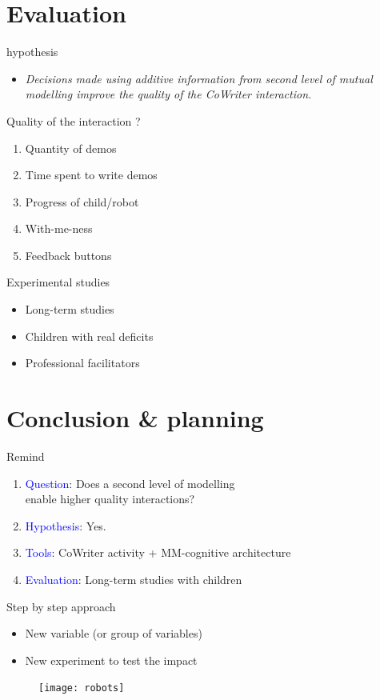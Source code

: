 \documentclass[compress]{beamer}
\begin{document}
\section{Evaluation}

\begin{frame}{hypothesis}
\begin{itemize}
	\item \textit{Decisions made using additive information from second level of mutual modelling improve the quality of the CoWriter interaction.}
\end{itemize}
\end{frame}

\begin{frame}{Quality of the interaction ?}
\begin{enumerate}
	\item Quantity of demos
	\item Time spent to write demos
	\item Progress of child/robot
	\item With-me-ness
	\item Feedback buttons 
\end{enumerate}
\end{frame}

\begin{frame}{Experimental studies}
\begin{itemize}
	\item Long-term studies
	\item Children with real deficits
	\item Professional facilitators
\end{itemize}
\end{frame}

\section{Conclusion \& planning}

\begin{frame}{Remind}
\begin{enumerate}
\item \textcolor{blue}{Question}: Does a second level of modelling\\enable higher quality interactions?
\item \textcolor{blue}{Hypothesis}: Yes.
\item \textcolor{blue}{Tools}: CoWriter activity + MM-cognitive architecture
\item \textcolor{blue}{Evaluation}: Long-term studies with children
\end{enumerate}
\end{frame}

\begin{frame}{Step by step approach}
\begin{itemize}
\item New variable (or group of variables)
\item New experiment to test the impact
\end{itemize}
\end{frame}

\begin{frame}
	\begin{figure}
        \centering
        \texttt{[image: robots]}
    \end{figure}
\end{frame}
\end{document}
